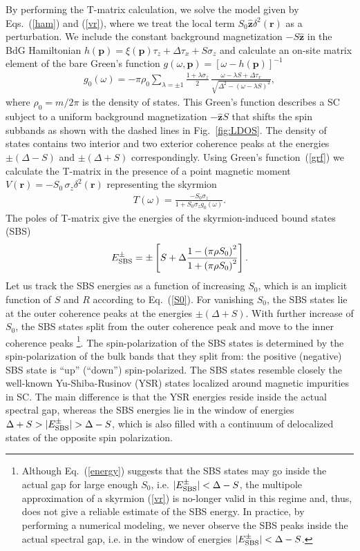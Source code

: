 \documentclass[twocolumn,showpacs,floatfix,longbibliography]{revtex4-1}
\begin{document}
By performing the T-matrix calculation, we solve the model given by Eqs.~(\ref{ham}) and (\ref{vr}), where we treat the local term $S_0 \hat{\bm z} \delta^2(\bm r)$ as a perturbation. We include the constant background magnetization $-S\hat{\bm z}$ in the BdG Hamiltonian $h(\bm p) = \xi(\bm p)\tau_z+\Delta \tau_x +  S\sigma_z$ and calculate an on-site matrix element of the bare Green's function $g(\omega,\bm p) = [\omega-h(\bm p)]^{-1}$
 \begin{align}
	 g_{0}(\omega)  =-\pi\rho_0\sum_{\lambda = \pm 1} \frac{1+\lambda\sigma_z}{2}\,\frac{\omega-\lambda S+\Delta\tau_x}{\sqrt{\Delta^2-\left( \omega-\lambda S \right)^2}},  \label{grf}
\end{align}
where $\rho_0 = m/2\pi$ is the density of states. This Green's function describes a SC subject to a uniform background magnetization $-\hat{\bm z} S$ that shifts the spin subbands as shown with the dashed lines in Fig.~\ref{fig:LDOS}.  The density of states contains two interior and two exterior coherence peaks at the energies $\pm(\Delta-S)$ and $\pm(\Delta+S)$ correspondingly.  Using Green's function~(\ref{grf}) we calculate the T-matrix in the presence of a point magnetic moment $V(\bm r)=-S_0\,\sigma_z \delta^2(\bm r)$ representing the skyrmion
\begin{align}
	T(\omega) =   \frac{-S_0\sigma_z}{1+S_0\sigma_zg_{0}(\omega)}. \label{tm}
\end{align}
The poles of T-matrix give the energies of the skyrmion-induced bound states (SBS)
\begin{align}
	E^\pm_{\rm SBS} = \pm\left[S+\Delta \frac{1-\left( \pi\rho S_0 \right)^2}{1+\left( \pi\rho S_0 \right)^2}\right].
	\label{energy}
\end{align}
Let us track the SBS energies as a function of increasing $S_0$, which is an implicit function of $S$ and $R$ according to Eq.~(\ref{S0}). For vanishing $S_0$, the SBS states lie at the outer coherence peaks at the energies $\pm (\Delta+S)$. With further increase of $S_0$, the SBS states split from the outer coherence peak and move to the inner coherence peaks \footnote{Although Eq.~(\ref{energy}) suggests that the SBS states may go inside the actual gap for large enough  $S_0$, i.e. $|E^\pm_{\rm SBS}|<\Delta-S$, the multipole approximation of a skyrmion (\ref{vr}) is no-longer valid in this regime and, thus, does not give a reliable estimate of the SBS energy. In practice, by performing a numerical modeling, we never observe the SBS peaks inside the actual spectral gap, i.e. in the window of energies $|E^\pm_{\rm SBS}|<\Delta-S$.}. The spin-polarization of the SBS states is determined by the spin-polarization of the bulk bands that they split from: the positive (negative) SBS state is ``up'' (``down'') spin-polarized. The SBS states resemble closely the well-known Yu-Shiba-Rusinov (YSR) states \cite{Yu,Shiba,Rusinov,Balatsky2006} localized around magnetic impurities in SC. The main difference is that the YSR energies reside inside the actual spectral gap, whereas the SBS energies lie in the window of energies $\Delta+S>|E^\pm_{\rm SBS}|>\Delta-S$, which is also filled with a continuum of delocalized states of the opposite spin polarization.
\end{document}
